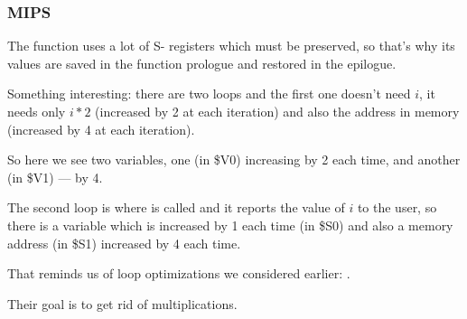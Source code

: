 ﻿\subsubsection{MIPS}

The function uses a lot of S- registers which must be preserved, so that's why its 
values are saved in the function prologue and restored in the epilogue.



Something interesting: there are two loops and the first one doesn't need $i$, it needs only 
$i*2$ (increased by 2 at each iteration) and also the address in memory (increased by 4 at each iteration).

So here we see two variables, one (in \$V0) increasing by 2 each time, and another (in \$V1) --- by 4.

The second loop is where \printf is called and it reports the value of $i$ to the user, 
so there is a variable
which is increased by 1 each time (in \$S0) and also a memory address (in \$S1) increased by 4 each time.

That reminds us of loop optimizations we considered earlier: .

Their goal is to get rid of multiplications.

